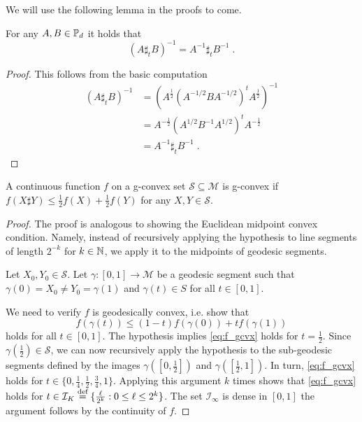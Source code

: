 \documentclass[twoside,11pt]{article}
\begin{document}
We will use the following lemma in the proofs to come. 

\begin{lemma}\label{lemma:inv_commute_sharp}
    For any $A, B \in \mathbb{P}_d$ it holds that
    \[
    \left(A \sharp_t B\right)^{-1} = A^{-1} \sharp_t B^{-1} \; .
    \] 
\end{lemma}
\begin{proof}
    This follows from the basic computation
    \begin{align*}
        \left(A \sharp_t B\right)^{-1} &= \left(A^{\frac{1}{2}}\left(A^{-1/2} B A^{-1/2}\right)^t A^{\frac{1}{2}} \right)^{-1} \\
        &= A^{-\frac{1}{2}}\left(A^{1/2} B^{-1} A^{1/2}\right)^t A^{-\frac{1}{2}}\\
        &= A^{-1} \sharp_t B^{-1} \;.
    \end{align*}
\end{proof}

\begin{lemma}
     A continuous function $f$ on a g-convex set $\mathcal{S}\subseteq \mathcal{M}$  is g-convex if $f\left(X \sharp Y \right) \leq \frac{1}{2} f\left(X\right)+\frac{1}{2} f\left(Y\right)$ for any $X,Y  \in \mathcal{S}$.
\end{lemma}
\begin{proof}
    The proof is analogous to showing the Euclidean midpoint convex condition. Namely, instead of recursively applying the hypothesis to line segments of length $2^{-k}$ for $k \in \mathbb{N}$, we apply it to the midpoints of geodesic segments.

    Let $X_0 ,Y_0 \in \mathcal{S}$. Let $\gamma:[0,1] \to \mathcal{M}$ be a geodesic segment such that $\gamma(0)=X_0 \neq Y_0 = \gamma(1)$ and $\gamma(t) \in S$ for all $t \in [0,1]$. 

    We need to verify $f$ is geodesically convex, i.e. show that 
    \begin{equation}\label{eq:f_gcvx}
    f(\gamma(t)) \leq (1-t)f(\gamma(0)) + t f(\gamma(1))    
    \end{equation}
    holds for all $t \in [0,1]$.
    The hypothesis implies \eqref{eq:f_gcvx} holds for $t = \frac{1}{2}$. Since $\gamma(\frac{1}{2}) \in \mathcal{S}$, we can now recursively apply the hypothesis to the sub-geodesic segments defined by the images $\gamma\left([0,\frac{1}{2}]\right)$ and $\gamma\left([\frac{1}{2}, 1]\right)$. In turn, \eqref{eq:f_gcvx} holds for $t \in \{0, \frac{1}{4}, \frac{1}{2}, \frac{3}{4}, 1\}$. Applying this argument $k$ times shows that \eqref{eq:f_gcvx} holds for $t \in \mathcal{I}_K \stackrel{\text{def}}{=} \{\frac{\ell}{2^k}: 0 \leq \ell \leq 2^k \}$. The set $\mathcal{I}_\infty$ is dense in $[0,1]$ the argument follows by the continuity of $f$. 
\end{proof}
\end{document}
